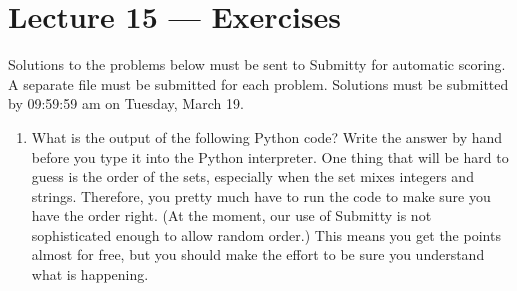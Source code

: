 \documentclass[letterpaper,10pt,english]{sphinxmanual}
\begin{document}
\chapter{Lecture 15 — Exercises}
\label{\detokenize{lecture_notes/lec15_sets_exercises/exercises:lecture-15-exercises}}\label{\detokenize{lecture_notes/lec15_sets_exercises/exercises::doc}}
Solutions to the problems below must be sent to Submitty for
automatic scoring.  A separate file must be submitted for each problem.
Solutions must be submitted by 09:59:59 am on Tuesday, March 19.
\begin{enumerate}
\def\theenumi{\arabic{enumi}}
\def\labelenumi{\theenumi .}
\makeatletter\def\p@enumii{\p@enumi \theenumi .}\makeatother
\item {} 
What is the output of the following Python code? Write the answer by
hand before you type it into the Python interpreter.  One thing
that will be hard to guess is the order of the sets, especially
when the set mixes integers and strings.  Therefore, you pretty
much have to run the code to make sure you have the order right.
(At the moment, our use of Submitty is not sophisticated enough to
allow random order.)  This means you get the points almost for
free, but you should make the effort to be sure you understand what
is happening.

\begin{sphinxVerbatim}[commandchars=\\\{\}]
  \PYG{p}{[}  \PYG{p}{]}
    
 

 

    
 


\end{sphinxVerbatim}
\end{enumerate}
\end{document}
